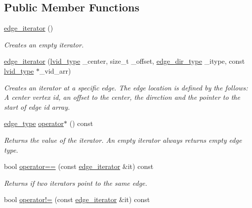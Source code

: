 \subsection*{Public Member Functions}
\begin{DoxyCompactItemize}
\item 
\hyperlink{classsaedb_1_1graph__storage_1_1edge__iterator_a121af17c88a8ddead25b8d26c626fa98}{edge\-\_\-iterator} ()
\begin{DoxyCompactList}\small\item\em Creates an empty iterator. \end{DoxyCompactList}\item 
\hyperlink{classsaedb_1_1graph__storage_1_1edge__iterator_aa3e367ad88af6089a0011dc3572b167a}{edge\-\_\-iterator} (\hyperlink{classsaedb_1_1graph__storage_a147a907accd64bb1f803a423d04dd04b}{lvid\-\_\-type} \-\_\-center, size\-\_\-t \-\_\-offset, \hyperlink{namespacesaedb_adf5ad13c09a48fb2f42f8e7348ea3ac3}{edge\-\_\-dir\-\_\-type} \-\_\-itype, const \hyperlink{classsaedb_1_1graph__storage_a147a907accd64bb1f803a423d04dd04b}{lvid\-\_\-type} $\ast$\-\_\-vid\-\_\-arr)
\begin{DoxyCompactList}\small\item\em Creates an iterator at a specific edge. The edge location is defined by the follows\-: A center vertex id, an offset to the center, the direction and the pointer to the start of edge id array. \end{DoxyCompactList}\item 
\hyperlink{classsaedb_1_1graph__storage_1_1edge__type}{edge\-\_\-type} \hyperlink{classsaedb_1_1graph__storage_1_1edge__iterator_ae22b1266928aadc78470ca76dbc24d85}{operator$\ast$} () const 
\begin{DoxyCompactList}\small\item\em Returns the value of the iterator. An empty iterator always returns empty edge type. \end{DoxyCompactList}\item 
bool \hyperlink{classsaedb_1_1graph__storage_1_1edge__iterator_a3fc5f6398f5f04338b3f1990919f4a70}{operator==} (const \hyperlink{classsaedb_1_1graph__storage_1_1edge__iterator}{edge\-\_\-iterator} \&it) const 
\begin{DoxyCompactList}\small\item\em Returns if two iterators point to the same edge. \end{DoxyCompactList}\item 
bool \hyperlink{classsaedb_1_1graph__storage_1_1edge__iterator_a18d08388d096af2837205d0d90b4e052}{operator!=} (const \hyperlink{classsaedb_1_1graph__storage_1_1edge__iterator}{edge\-\_\-iterator} \&it) const 

\end{DoxyCompactItemize}

